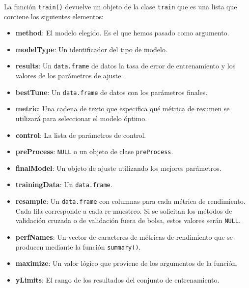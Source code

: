 \documentclass[12pt,spanish,a4paper]{article}
\newenvironment{Shaded}{\begin{snugshade}}{\end{snugshade}}
\newcommand{\DataTypeTok}[1]{\textcolor[rgb]{0.13,0.29,0.53}{#1}}
\newcommand{\DecValTok}[1]{\textcolor[rgb]{0.00,0.00,0.81}{#1}}
\newcommand{\KeywordTok}[1]{\textcolor[rgb]{0.13,0.29,0.53}{\textbf{#1}}}
\newcommand{\NormalTok}[1]{#1}
\newcommand{\OperatorTok}[1]{\textcolor[rgb]{0.81,0.36,0.00}{\textbf{#1}}}
\newcommand{\StringTok}[1]{\textcolor[rgb]{0.31,0.60,0.02}{#1}}
\numberwithin{equation}{section}
\begin{document}
\begin{Shaded}
\end{Shaded}

La función \texttt{train()} devuelve un objeto de la clase
\texttt{train} que es una lista que contiene los siguientes elementos:

\begin{itemize}
\item
  \textbf{method}: El modelo elegido. Es el que hemos pasado como
  argumento.
\item
  \textbf{modelType}: Un identificador del tipo de modelo.
\item
  \textbf{results}: Un \texttt{data.frame} de datos la tasa de error de
  entrenamiento y los valores de los parámetros de ajuste.
\item
  \textbf{bestTune}: Un \texttt{data.frame} de datos con los parámetros
  finales.
\item
  \textbf{metric}: Una cadena de texto que especifica qué métrica de
  resumen se utilizará para seleccionar el modelo óptimo.
\item
  \textbf{control}: La lista de parámetros de control.
\item
  \textbf{preProcess}: \texttt{NULL} o un objeto de clase
  \texttt{preProcess}.
\item
  \textbf{finalModel}: Un objeto de ajuste utilizando los mejores
  parámetros.
\item
  \textbf{trainingData}: Un \texttt{data.frame}.
\item
  \textbf{resample}: Un \texttt{data.frame} con columnas para cada
  métrica de rendimiento. Cada fila corresponde a cada re-muestreo. Si
  se solicitan los métodos de validación cruzada o de validación fuera
  de bolsa, estos valores serán \texttt{NULL}.
\item
  \textbf{perfNames}: Un vector de caracteres de métricas de rendimiento
  que se producen mediante la función \texttt{summary()}.
\item
  \textbf{maximize}: Un valor lógico que proviene de los argumentos de
  la función.
\item
  \textbf{yLimits}: El rango de los resultados del conjunto de
  entrenamiento.
\end{itemize}
\end{document}
